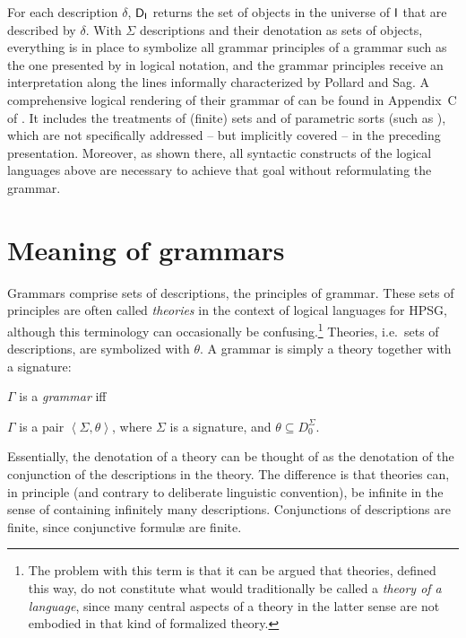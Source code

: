 \documentclass[output=paper,biblatex,babelshorthands,newtxmath,draftmode,colorlinks,citecolor=brown]{langscibook}
\begin{document}
{\largerpage
For each description $\delta$, $\mathsf{D}_{\mathsf{I}}$ returns the set of
objects in the universe of $\mathsf{I}$ that are described by
$\delta$. With $\Sigma$ descriptions and their denotation as sets of
objects, everything is in place to symbolize all grammar
principles of a grammar such as the one presented by
\citet{PollardSag1994} in logical notation, and the grammar principles
receive an interpretation along the lines
informally characterized by Pollard and Sag. A comprehensive logical
rendering of their grammar of  can be found in Appendix~C of
\citet{Richter2004a-u}. It includes the treatments of (finite) sets
and of parametric sorts (such as ), which are not
specifically addressed -- but implicitly covered -- in
the preceding presentation. Moreover, as shown there, all syntactic
constructs of the logical languages above are necessary to achieve
that goal without reformulating the grammar.



\section{Meaning of grammars}
\label{sec-grammar-meaning}

Grammars comprise sets of descriptions, the principles of grammar. These sets of
principles are often called \emph{theories} in the context of
logical languages for HPSG, although this terminology can occasionally
be confusing.\footnote{The problem with this term is that
  it can be argued that theories, defined this way, do not constitute what would
  traditionally be called a \emph{theory of a language}, since many central
  aspects of a theory in the latter sense are not embodied in that kind
  of formalized theory.} Theories, i.e.\ sets of descriptions, are
symbolized with $\theta$.  A grammar is simply a theory together with a
signature:

\begin{mydef}\label{def-grammar}
  $\Gamma$ is a \emph{grammar} iff
  
$\Gamma$ is a pair
\( \left<\Sigma, \theta \right>\), where
$\Sigma$ is a signature, and
$\theta \subseteq D_0^{\Sigma}$.
\end{mydef}

Essentially, the denotation of a theory can be thought of as
the denotation of the conjunction of the descriptions in the theory.
The difference is
that theories can, in principle (and contrary to deliberate linguistic
convention), be infinite in the sense of containing infinitely many
descriptions. Conjunctions of descriptions are finite, since conjunctive
formulæ are finite.

}
\end{document}
